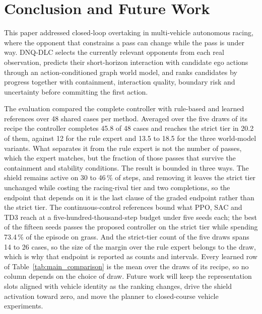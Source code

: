 \documentclass[journal]{IEEEtran}
\begin{document}
\section{Conclusion and Future Work}
This paper addressed closed-loop overtaking in multi-vehicle autonomous racing,
where the opponent that constrains a pass can change while the pass is under way.
DNQ-DLC selects the currently relevant opponents from each real observation,
predicts their short-horizon interaction with candidate ego actions through an
action-conditioned graph world model, and ranks candidates by progress together
with containment, interaction quality, boundary risk and uncertainty before
committing the first action.

The evaluation compared the complete controller with rule-based and learned
references over 48 shared cases per method. Averaged over the five
draws of its recipe the controller completes 45.8 of 48 cases and reaches the
strict tier in 20.2 of them, against 12 for the rule expert and 13.5 to 18.5 for
the three world-model variants. What separates it from the rule expert is not the
number of passes, which the expert matches, but the fraction of those passes that
survive the containment and stability conditions. The result is bounded in three
ways. The shield remains active on 30 to 46\,\% of steps, and removing it leaves
the strict tier unchanged while costing the racing-rival tier and two
completions, so the endpoint that depends on it is the last clause of the graded
endpoint rather than the strict tier. The continuous-control references bound
what PPO, SAC and TD3 reach at a five-hundred-thousand-step budget under five
seeds each; the best of the fifteen seeds passes the proposed controller on the
strict tier while spending 73.4\,\% of the episode on grass. And the strict-tier
count of the five draws spans 14 to 26 cases, so the size of the margin over the
rule expert belongs to the draw, which is why that endpoint is reported as
counts and intervals. Every learned row of
Table~\ref{tab:main_comparison} is the mean over the draws of its recipe, so no
column depends on the choice of draw. Future work will keep
the representation slots aligned with vehicle identity as the ranking changes,
drive the shield activation toward zero, and move the planner to closed-course
vehicle experiments.
\end{document}

